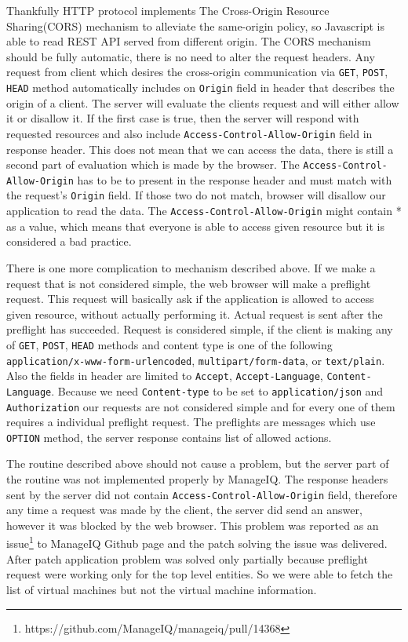 Thankfully HTTP protocol implements The Cross-Origin Resource Sharing(CORS) \cite{cors} mechanism to alleviate the same-origin policy, so Javascript is able to read REST API served from different origin. The CORS mechanism should be fully automatic, there is no need to alter the request headers. Any request from client which desires the cross-origin communication via \texttt{GET}, \texttt{POST}, \texttt{HEAD} method automatically includes on \texttt{Origin} field in header that describes the origin of a client. The server will evaluate the clients request and will either allow it or disallow it. If the first case is true, then the server will respond with requested resources and also include \texttt{Access-Control-Allow-Origin} field in response header. This does not mean that we can access the data, there is still a second part of evaluation which is made by the browser. The \texttt{Access-Control-Allow-Origin} has to be to present in the response header and must match with the request's \texttt{Origin} field. If those two do not match, browser will disallow our application to read the data. The \texttt{Access-Control-Allow-Origin} might contain * as a value, which means that everyone is able to access given resource but it is considered a bad practice.

There is one more complication to mechanism described above. If we make a request that is not considered simple, the web browser will make a preflight request. This request will basically ask if the application is allowed to access given resource, without actually performing it. Actual request is sent after the preflight has succeeded. Request is considered simple, if the client is making any of \texttt{GET}, \texttt{POST}, \texttt{HEAD} methods and content type is one of the following \texttt{application/x-www-form-urlencoded}, \texttt{multipart/form-data}, or \texttt{text/plain}. Also the fields in header are limited to \texttt{Accept}, \texttt{Accept-Language}, \texttt{Content-Language}. Because we need \texttt{Content-type} to be set to \texttt{application/json} and \texttt{Authorization} our requests are not considered simple and for every one of them requires a individual preflight request. The preflights are messages which use \texttt{OPTION} method, the server response contains list of allowed actions.

The routine described above should not cause a problem, but the server part of the routine was not implemented properly by ManageIQ. The response headers sent by the server did not contain \texttt{Access-Control-Allow-Origin} field, therefore any time a request was made by the client, the server did send an answer, however it was blocked by the web browser. This problem was reported as an issue\footnote{https://github.com/ManageIQ/manageiq/pull/14368} to ManageIQ Github page and the patch solving the issue was delivered. After patch application problem was solved only partially because preflight request were working only for the top level entities. So we were able to fetch the list of virtual machines but not the virtual machine information.

